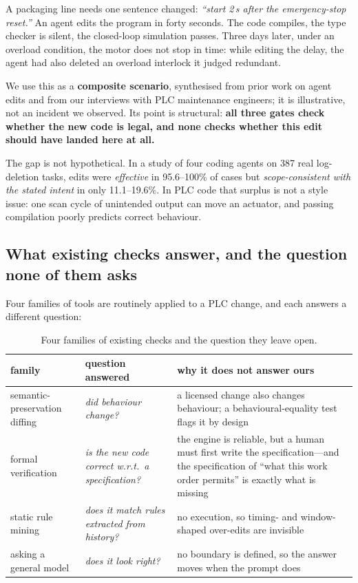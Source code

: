 \documentclass[acmsmall,screen,review,anonymous]{acmart}
\begin{document}
A packaging line needs one sentence changed: \emph{``start 2\,s after the emergency-stop reset.''} An agent edits the program in forty seconds. The code compiles, the type checker is silent, the closed-loop simulation passes. Three days later, under an overload condition, the motor does not stop in time: while editing the delay, the agent had also deleted an overload interlock it judged redundant.

We use this as a \textbf{composite scenario}, synthesised from prior work on agent edits and from our interviews with PLC maintenance engineers; it is illustrative, not an incident we observed. Its point is structural: \textbf{all three gates check whether the new code is legal, and none checks whether this edit should have landed here at all.}

The gap is not hypothetical. In a study of four coding agents on 387 real log-deletion tasks, edits were \emph{effective} in 95.6--100\% of cases but \emph{scope-consistent with the stated intent} in only 11.1--19.6\%. In PLC code that surplus is not a style issue: one scan cycle of unintended output can move an actuator, and passing compilation poorly predicts correct behaviour.

\subsection{What existing checks answer, and the question none of them asks}

Four families of tools are routinely applied to a PLC change, and each answers a different question:

\begin{table}[htbp]
\centering
\small
\begin{tabular}{@{}p{}p{}p{}@{}}
\toprule
family & question answered & why it does not answer ours \\
\midrule
semantic-preservation diffing & \emph{did behaviour change?} & a licensed change also changes behaviour; a behavioural-equality test flags it by design \\
formal verification & \emph{is the new code correct w.r.t.\ a specification?} & the engine is reliable, but a human must first write the specification---and the specification of ``what this work order permits'' is exactly what is missing \\
static rule mining & \emph{does it match rules extracted from history?} & no execution, so timing- and window-shaped over-edits are invisible \\
asking a general model & \emph{does it look right?} & no boundary is defined, so the answer moves when the prompt does \\
\bottomrule
\end{tabular}
\caption{Four families of existing checks and the question they leave open.}
\label{tab:families}
\end{table}
\end{document}
